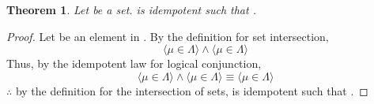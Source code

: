 \documentclass[preview]{standalone}
\newtheorem{theorem}{Theorem}
\begin{document}
\begin{theorem} %
    Let \bm{$\Lambda$} be a set.
    \bm{$\Lambda$} is idempotent such that 
    \bm{$\Lambda \cap \Lambda = \Lambda$}.
\end{theorem}
\begin{proof}
    Let \bm{$\mu$} be an element in \bm{$\Lambda \cap \Lambda$}. 
    By the definition for set intersection,
    \begin{equation*}
        \Big \langle \mu \in \Lambda \Big \rangle 
            \land 
        \Big \langle \mu \in \Lambda \Big \rangle
    \end{equation*}
    Thus, by the idempotent law for logical conjunction,
    \begin{equation*}
        \Big \langle \mu \in \Lambda \Big \rangle 
            \land 
        \Big \langle \mu \in \Lambda \big \rangle 
            \equiv 
        \Big \langle \mu \in \Lambda \Big \rangle
    \end{equation*}
    $\therefore$ by the definition for the intersection of sets,
    \bm{$\Lambda$} is idempotent such that 
    \bm{$\Lambda \cap \Lambda = \Lambda$}.
\end{proof}
\end{document}
